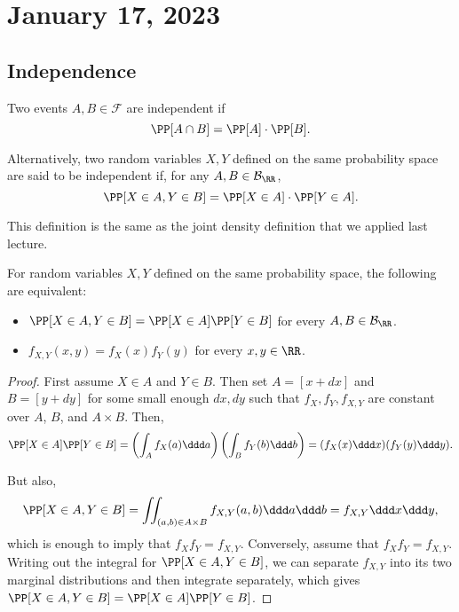 \section{January 17, 2023}

\subsection{Independence}

\begin{definition}

Two events $A,B\in \mathcal{F}$ are independent if 
\[\PP[A\cap B] = \PP[A]\cdot \PP[B].\]

Alternatively, two random variables $X,Y$ defined on the same probability space are said to be independent if, for any $A,B\in \mathcal{B}_{\RR}$,
\[\PP[X\in A, Y\in B] = \PP[X\in A]\cdot \PP[Y\in A].\]
\end{definition}

This definition is the same as the joint density definition that we applied last lecture. 

\begin{theorem}
\thmlabel

For random variables $X,Y$ defined on the same probability space, the following are equivalent: 
\begin{itemize}
    \item $\PP[X\in A, Y\in B] = \PP[X\in A]\PP[Y\in B]$ for every $A,B\in \mathcal{B}_{\RR}$. 
    \item $f_{X,Y}(x,y) = f_X(x)f_Y(y)$ for every $x,y\in \RR$. 
\end{itemize}
\end{theorem}

\begin{proof}
First assume $X\in A$ and $Y\in B$. Then set $A = [x+dx]$ and $B = [y+dy]$ for some small enough $dx,dy$ such that $f_X, f_Y, f_{X,Y}$ are constant over $A$, $B$, and $A\times B$. Then, 
\[\PP[X\in A]\PP[Y\in B] = \left(\int_A f_X(a)\ddd a\right)\left(\int_B f_Y(b)\ddd b\right) = (f_X(x)\ddd x)(f_Y(y)\ddd y).\]

But also, 
\[\PP[X\in A, Y\in B] = \iint_{(a,b)\in A\times B}f_{X,Y}(a,b)\ddd a\ddd b = f_{X,Y}\ddd x\ddd y,\]
which is enough to imply that $f_Xf_Y = f_{X,Y}$. Conversely, assume that $f_Xf_Y = f_{X,Y}$. Writing out the integral for $\PP[X\in A, Y\in B]$, we can separate $f_{X,Y}$ into its two marginal distributions and then integrate separately, which gives $\PP[X\in A, Y\in B] = \PP[X\in A]\PP[Y\in B]$. 
\end{proof}

